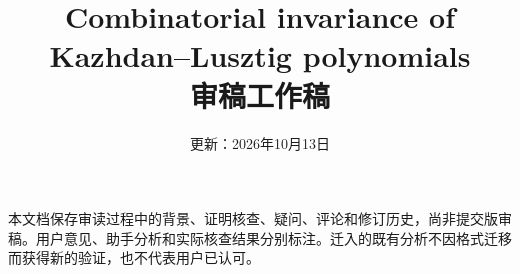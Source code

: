 \documentclass[UTF8,a4paper,11pt,fontset=fandol]{ctexart}
\title{Combinatorial invariance of Kazhdan--Lusztig polynomials\\审稿工作稿}
\author{}
\date{更新：2026年10月13日}
\theoremstyle{definition}
\theoremstyle{remark}
\begin{document}
\maketitle
\noindent 本文档保存审读过程中的背景、证明核查、疑问、评论和修订历史，尚非提交版审稿。用户意见、助手分析和实际核查结果分别标注。迁入的既有分析不因格式迁移而获得新的验证，也不代表用户已认可。
\tableofcontents




\appendix


\end{document}
